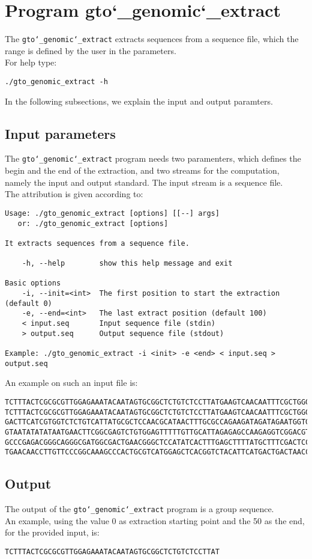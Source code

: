 \section{Program gto\char`_genomic\char`_extract}
The \texttt{gto\char`_genomic\char`_extract} extracts sequences from a sequence file, which the range is defined by the user in the parameters.\\
For help type:
\begin{lstlisting}
./gto_genomic_extract -h
\end{lstlisting}
In the following subsections, we explain the input and output paramters.

\subsection*{Input parameters}

The \texttt{gto\char`_genomic\char`_extract} program needs two paramenters, which defines the begin and the end of the extraction, and two streams for the computation, namely the input and output standard. The input stream is a sequence file.\\
The attribution is given according to:
\begin{lstlisting}
Usage: ./gto_genomic_extract [options] [[--] args]
   or: ./gto_genomic_extract [options]

It extracts sequences from a sequence file.

    -h, --help        show this help message and exit

Basic options
    -i, --init=<int>  The first position to start the extraction (default 0)
    -e, --end=<int>   The last extract position (default 100)
    < input.seq       Input sequence file (stdin)
    > output.seq      Output sequence file (stdout)

Example: ./gto_genomic_extract -i <init> -e <end> < input.seq > output.seq
\end{lstlisting}
An example on such an input file is:
\begin{lstlisting}
TCTTTACTCGCGCGTTGGAGAAATACAATAGTGCGGCTCTGTCTCCTTATGAAGTCAACAATTTCGCTGGGACTTGCGGC
TCTTTACTCGCGCGTTGGAGAAATACAATAGTGCGGCTCTGTCTCCTTATGAAGTCAACAATTTCGCTGGGACTTGCGGC
GACTTCATCGTGGTCTCTGTCATTATGCGCTCCAACGCATAACTTTGCGCCAGAAGATAGATAGAATGGTGTAAGAAACT
GTAATATATATAATGAACTTCGGCGAGTCTGTGGAGTTTTTGTTGCATTAGAGAGCCAAGAGGTCGGACGTCCTCACGTA
GCCCGAGACGGGCAGGGCGATGGCGACTGAACGGGCTCCATATCACTTTGAGCTTTTATGCTTTCGACTCCTCCAGGAGC
TGAACAACCTTGTTCCCGGCAAAGCCCACTGCGTCATGGAGCTCACGGTCTACATTCATGACTGACTAACCGTAAACTGC
\end{lstlisting}

\subsection*{Output}
The output of the \texttt{gto\char`_genomic\char`_extract} program is a group sequence.\\
An example, using the value 0 as extraction starting point and the 50 as the end, for the provided input, is:
\begin{lstlisting}
TCTTTACTCGCGCGTTGGAGAAATACAATAGTGCGGCTCTGTCTCCTTAT
\end{lstlisting}